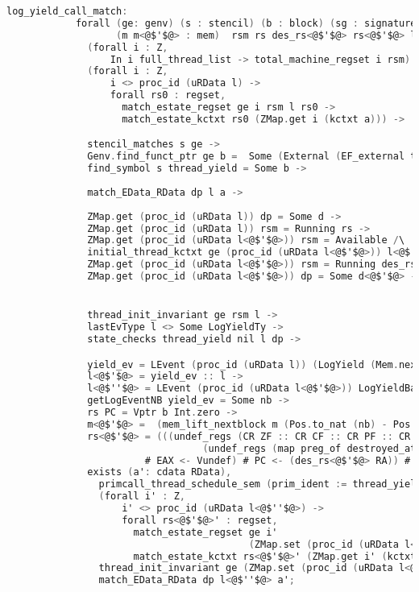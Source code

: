 \begin{lstlisting}[language=C]     
          log_yield_call_match:
            forall (ge: genv) (s : stencil) (b : block) (sg : signature) 
                   (m m<@$'$@> : mem)  rsm rs des_rs<@$'$@> rs<@$'$@> l l<@$'$@> l<@$''$@> d d<@$'$@> dp (a: cdata RData) nb yield_ev,
              (forall i : Z,
                  In i full_thread_list -> total_machine_regset i rsm) ->
              (forall i : Z,
                  i <> proc_id (uRData l) ->
                  forall rs0 : regset,
                    match_estate_regset ge i rsm l rs0 ->
                    match_estate_kctxt rs0 (ZMap.get i (kctxt a))) ->

              stencil_matches s ge ->
              Genv.find_funct_ptr ge b =  Some (External (EF_external thread_yield sg)) ->
              find_symbol s thread_yield = Some b ->
              
              match_EData_RData dp l a ->
              
              ZMap.get (proc_id (uRData l)) dp = Some d ->
              ZMap.get (proc_id (uRData l)) rsm = Running rs ->
              ZMap.get (proc_id (uRData l<@$'$@>)) rsm = Available /\
              initial_thread_kctxt ge (proc_id (uRData l<@$'$@>)) l<@$'$@> = Some des_rs<@$'$@> \/
              ZMap.get (proc_id (uRData l<@$'$@>)) rsm = Running des_rs<@$'$@> ->
              ZMap.get (proc_id (uRData l<@$'$@>)) dp = Some d<@$'$@> ->


              thread_init_invariant ge rsm l ->
              lastEvType l <> Some LogYieldTy ->
              state_checks thread_yield nil l dp ->

              yield_ev = LEvent (proc_id (uRData l)) (LogYield (Mem.nextblock m)) ->
              l<@$'$@> = yield_ev :: l ->
              l<@$''$@> = LEvent (proc_id (uRData l<@$'$@>)) LogYieldBack :: l<@$'$@> ->
              getLogEventNB yield_ev = Some nb ->
              rs PC = Vptr b Int.zero ->
              m<@$'$@> =  (mem_lift_nextblock m (Pos.to_nat (nb) - Pos.to_nat (Mem.nextblock m) % nat)) ->
              rs<@$'$@> = (((undef_regs (CR ZF :: CR CF :: CR PF :: CR SF :: CR OF :: nil)
                                  (undef_regs (map preg_of destroyed_at_call) des_rs<@$'$@>))
                        # EAX <- Vundef) # PC <- (des_rs<@$'$@> RA)) # RA <- Vundef ->
              exists (a': cdata RData),
                primcall_thread_schedule_sem (prim_ident := thread_yield) big_thread_yield_spec s rs (m, a) rs<@$'$@> (m<@$'$@>, a') /\
                (forall i' : Z,
                    i' <> proc_id (uRData l<@$''$@>) ->
                    forall rs<@$'$@>' : regset,
                      match_estate_regset ge i'
                                          (ZMap.set (proc_id (uRData l<@$''$@>)) (Running rs<@$'$@>) rsm) l<@$''$@> rs<@$'$@>' ->
                      match_estate_kctxt rs<@$'$@>' (ZMap.get i' (kctxt a'))) /\
                thread_init_invariant ge (ZMap.set (proc_id (uRData l<@$''$@>)) (Running rs<@$'$@>) rsm) l<@$''$@> /\
                match_EData_RData dp l<@$''$@> a';
\end{lstlisting}

